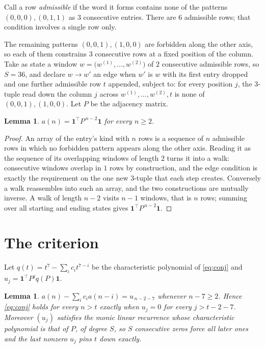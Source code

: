 \documentclass[11pt,a4paper]{article}
\theoremstyle{plain}
\newtheorem{lemma}[theorem]{Lemma}
\theoremstyle{definition}
\begin{document}
Call a row \emph{admissible} if the word it forms contains none of the patterns
$(0,0,0), (0,1,1)$ as $3$ consecutive entries. There are $6$ admissible rows; that condition
involves a single row only.

The remaining patterns $(0,0,1), (1,0,0)$ are forbidden along the other axis, so each of them
constrains $3$ consecutive rows at a fixed position of the column. Take as state a
window $w=\bigl(w^{(1)},\dots,w^{(2)}\bigr)$ of $2$ consecutive admissible
rows, so $S=36$, and declare $w\to w'$ an edge when $w'$ is $w$ with its first entry
dropped and one further admissible row $t$ appended, subject to: for every position
$j$, the $3$-tuple read down the column $j$ across $w^{(1)},\dots,w^{(2)},t$
is none of $(0,0,1), (1,0,0)$. Let $P$ be the adjacency matrix.

\begin{lemma}\label{lem:walk}
$a(n)=\mathbf{1}^{\!\top}P^{\,n-2}\mathbf{1}$ for every $n\ge2$.
\end{lemma}

\begin{proof}
An array of the entry's kind with $n$ rows is a sequence of $n$ admissible rows in
which no forbidden pattern appears along the other axis. Reading it as the sequence of its
overlapping windows of length $2$ turns it into a walk: consecutive windows overlap in
$1$ rows by construction, and the edge condition is exactly the requirement on the one
new $3$-tuple that each step creates. Conversely a walk reassembles into such an array,
and the two constructions are mutually inverse. A walk of length $n-2$ visits $n-1$
windows, that is $n$ rows; summing over all starting and ending states gives
$\mathbf{1}^{\!\top}P^{\,n-2}\mathbf{1}$.
\end{proof}

\section{The criterion}

Let $q(t)=t^{7}-\sum_i c_i t^{7-i}$ be the characteristic polynomial of
\eqref{eq:conj} and $u_j=\mathbf{1}^{\!\top}P^{j}q(P)\mathbf{1}$.

\begin{lemma}\label{lem:crit}
$a(n)-\sum_i c_i a(n-i)=u_{\,n-2-7}$ whenever $n-7\ge2$. Hence
\eqref{eq:conj} holds for every $n>t$ exactly when $u_j=0$ for every
$j>t-2-7$. Moreover $(u_j)$ satisfies the monic linear recurrence whose
characteristic polynomial is that of $P$, of degree $S$, so $S$ consecutive zeros force all
later ones and the last nonzero $u_j$ pins $t$ down exactly.
\end{lemma}
\end{document}
